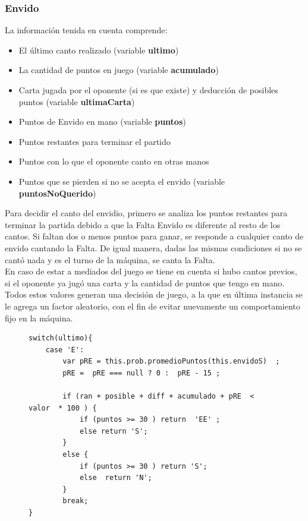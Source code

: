 \documentclass[12pt,a4paper]{article}
\begin{document}
\subsubsection{Envido}
La informaci\'on tenida en cuenta comprende:
\begin{itemize}
\item El \'ultimo canto realizado (variable \textbf{ultimo})
\item La cantidad de puntos en juego (variable \textbf{acumulado})
\item Carta jugada por el oponente (si es que existe) y deducci\'on de posibles puntos (variable \textbf{ultimaCarta})
\item Puntos de Envido en mano (variable \textbf{puntos})
\item Puntos restantes para terminar el partido
\item Puntos con lo que el oponente canto en otras manos
\item Puntos que se pierden si no se acepta el envido (variable \textbf{puntosNoQuerido})
\end{itemize}


Para decidir el canto del envidio, primero se analiza los puntos restantes para terminar la partida debido a que la Falta Envido es diferente al 
resto de los cantos. Si faltan dos o menos puntos para ganar, se responde a cualquier canto de envido cantando la Falta. De igual manera, dadas
las mismas condiciones si no se cant\'o nada y es el turno de la m\'aquina, se canta la Falta.\\
\noindent En caso de estar a mediados del juego se tiene en cuenta si hubo cantos previos, si el oponente ya jug\'o una carta y la cantidad de puntos que tengo en mano. 
Todos estos valores generan una decisi\'on de juego, a la que en \'ultima instancia se le agrega un factor aleatorio, con el fin de evitar nuevamente
un comportamiento fijo en la m\'aquina.



\begin{figure}[h]
\lstset{language=java,caption=Extracto de la funci\'on envido,label=lst:nicecode}
\begin{lstlisting}
switch(ultimo){
	case 'E':
		var pRE = this.prob.promedioPuntos(this.envidoS)  ;
		pRE =  pRE === null ? 0 :  pRE - 15 ; 
										                  
		if (ran + posible + diff + acumulado + pRE  <  valor  * 100 ) {
			if (puntos >= 30 ) return  'EE' ; 
			else return 'S';
		} 
		else { 
			if (puntos >= 30 ) return 'S'; 
			else  return 'N';  
		}
		break;
}

\end{lstlisting}
\end{figure}
\end{document}
